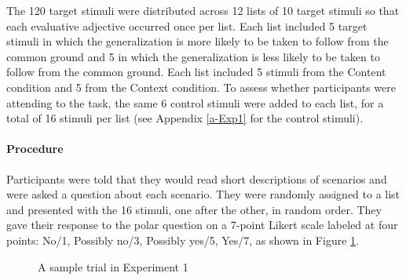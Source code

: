 \documentclass[11pt,fleqn]{article}
\newcommand{\6}{\mbox{$[\hspace*{-.6mm}[$}}
\newcommand{\9}{\mbox{$]\hspace*{-.6mm}]$}}
\begin{document}
The 120 target stimuli were distributed across 12 lists of 10 target stimuli so that each evaluative adjective occurred once per list. Each list included 5 target stimuli in which the generalization is more likely to be taken to follow from the common ground and 5 in which the generalization is less likely to be taken to follow from the common ground. Each list included 5 stimuli from the Content condition and 5 from the Context condition. To assess whether participants were attending to the task, the same 6 control stimuli were added to each list, for a total of 16 stimuli per list (see Appendix \ref{a-Exp1} for the control stimuli). 

\paragraph{Procedure}

Participants were told that they would read short descriptions of scenarios and were asked a question about each scenario. They were randomly assigned to a list and presented with the 16 stimuli, one after the other, in random order. They gave their response to the polar question on a 7-point Likert scale labeled at four points: No/1, Possibly
no/3, Possibly yes/5, Yes/7, as shown in Figure \ref{f-trial-exp1}. 

\begin{figure}[h!]
\centering


\caption{A sample trial in Experiment 1}\label{f-trial-exp1}
\end{figure}
\end{document}
